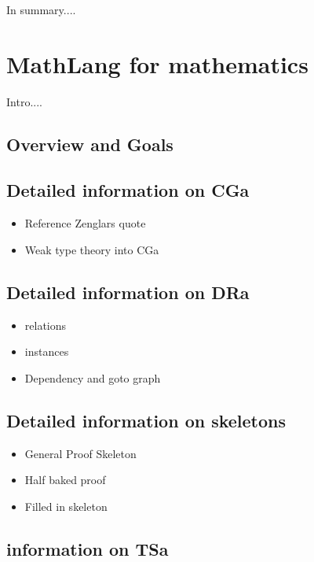 In summary....

\section{MathLang for mathematics}

Intro....

\subsection{Overview and Goals}

\subsection{Detailed information on CGa}

\begin{itemize}
\item Reference Zenglars quote

\item Weak type theory into CGa

\end{itemize}

\subsection{Detailed information on DRa}

\begin{itemize}
\item relations

\item instances

\item Dependency and goto graph
\end{itemize}

\subsection{Detailed information on skeletons}

\begin{itemize}
\item General Proof Skeleton

\item Half baked proof

\item Filled in skeleton
\end{itemize}

\subsection{information on TSa}




